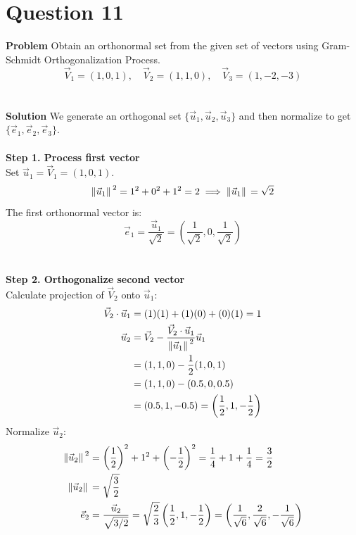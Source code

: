 \documentclass{article}
\begin{document}
\pagebreak


\section{Question 11}
\textbf{Problem}
Obtain an orthonormal set from the given set of vectors using Gram-Schmidt
Orthogonalization Process.\\
\[
	\vec{V}_{1} = (1, 0, 1), \quad \vec{V}_{2} = (1, 1, 0), \quad \vec{V}_{3} = (1, -2, -3)
\]
\\
\\
\textbf{Solution}
We generate an orthogonal set $\{\vec{u}_{1}, \vec{u}_{2}, \vec{u}_{3}\}$ and
then normalize to get $\{\vec{e}_{1}, \vec{e}_{2}, \vec{e}_{3}\}$.
\\
\\
\textbf{Step 1. Process first vector}
\\
Set $\vec{u}_{1} = \vec{V}_{1} = (1, 0, 1)$.
\[
	\norm*{\vec{u}_{1}}^2 = 1^2 + 0^2 + 1^2 = 2 \implies \norm*{\vec{u}_{1}} = \sqrt{2}
\]
The first orthonormal vector is:
\[
	\vec{e}_{1} = \frac{\vec{u}_{1}}{\sqrt{2}} = \left( \frac{1}{\sqrt{2}}, 0, \frac{1}{\sqrt{2}} \right)
\]
\\
\\
\textbf{Step 2. Orthogonalize second vector}
\\
Calculate projection of $\vec{V}_{2}$ onto $\vec{u}_{1}$:
\begin{align*}
	\vec{V}_{2} \cdot \vec{u}_{1} & = (1)(1) + (1)(0) + (0)(1) = 1                                                          \\
	\vec{u}_{2}                   & = \vec{V}_{2} - \frac{\vec{V}_{2} \cdot \vec{u}_{1}}{\norm*{\vec{u}_{1}}^2} \vec{u}_{1} \\
	                              & = (1, 1, 0) - \frac{1}{2}(1, 0, 1)                                                      \\
	                              & = (1, 1, 0) - (0.5, 0, 0.5)                                                             \\
	                              & = (0.5, 1, -0.5) = \left( \frac{1}{2}, 1, -\frac{1}{2} \right)
\end{align*}
Normalize $\vec{u}_{2}$:
\begin{align*}
	\norm*{\vec{u}_{2}}^2 & = \left(\frac{1}{2}\right)^2 + 1^2 + \left(-\frac{1}{2}\right)^2 = \frac{1}{4} + 1 + \frac{1}{4} = \frac{3}{2} \\
	\norm*{\vec{u}_{2}}   & = \sqrt{\frac{3}{2}}                                                                                           \\
	\vec{e}_{2}           & = \frac{\vec{u}_{2}}{\sqrt{3/2}} = \sqrt{\frac{2}{3}} \left( \frac{1}{2}, 1, -\frac{1}{2} \right)
	= \left( \frac{1}{\sqrt{6}}, \frac{2}{\sqrt{6}}, -\frac{1}{\sqrt{6}} \right)
\end{align*}
\end{document}
